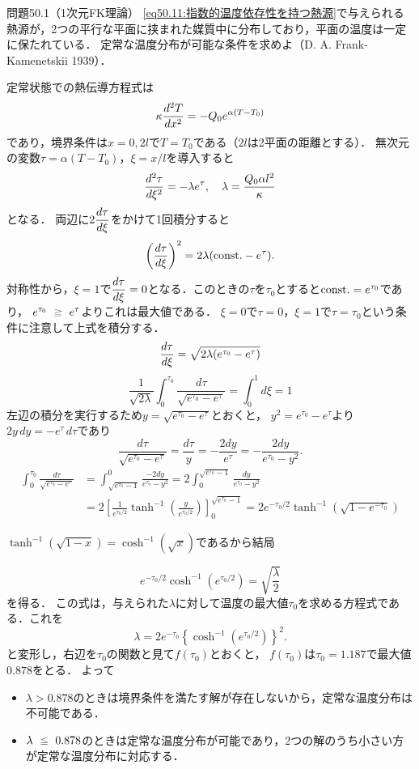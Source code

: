 \begin{mondai}{}{問題50.1（1次元FK理論）}
\eqref{eq50.11:指数的温度依存性を持つ熱源}で与えられる熱源が，2つの平行な平面に挟まれた媒質中に分布しており，平面の温度は一定に保たれている．
定常な温度分布が可能な条件を求めよ（D. A. Frank-Kamenetskii 1939）．
\end{mondai}
\begin{kaitou}
定常状態での熱伝導方程式は
\[
    \kappa \dv[2]{T}{x} = - Q_0 e^{\alpha(T-T_0)}
\]
であり，境界条件は$x=0,2l$で$T=T_0$である（$2l$は2平面の距離とする）．
無次元の変数$\tau = \alpha(T-T_0)$，$\xi = x/l$を導入すると
\[
    \dv[2]{\tau}{\xi} = -\lambda e^{\tau}, \quad \lambda = \frac{Q_0 \alpha l^2}{\kappa}
\]
となる．
両辺に$2\ddv{\tau}{\xi}$をかけて1回積分すると
\[
    \left( \dv{\tau}{\xi} \right)^2 = 2\lambda (\mathrm{const.} - e^{\tau}).
\]
対称性から，$\xi=1$で$\ddv{\tau}{\xi}=0$となる．このときの$\tau$を$\tau_0$とすると$\mathrm{const.}=e^{\tau_0}$であり，
$e^{\tau_0} \ijou e^\tau$よりこれは最大値である．
$\xi=0$で$\tau=0$，$\xi=1$で$\tau=\tau_0$という条件に注意して上式を積分する．
\[
    \dv{\tau}{\xi} = \sqrt{2\lambda (e^{\tau_0} - e^{\tau}) }
\]
\[
    \frac{1}{\sqrt{2\lambda}} \int_{0}^{\tau_0} \frac{d\tau}{\sqrt{e^{\tau_0} - e^{\tau}}} = \int_{0}^{1} d\xi = 1
\]
左辺の積分を実行するため$y=\sqrt{e^{\tau_0} - e^{\tau}}$とおくと，
$y^2 = e^{\tau_0} - e^{\tau}$より$2y\,dy = - e^{\tau} \, d\tau$であり
\[
    \frac{d\tau}{\sqrt{e^{\tau_0} - e^{\tau}}} = \frac{d\tau}{y}
    = -\frac{2dy}{e^\tau} = - \frac{2dy}{e^{\tau_0}-y^2}.
\]
\begin{align*}
    \int_{0}^{\tau_0} \frac{d\tau}{\sqrt{e^{\tau_0} - e^{\tau}}}
    &= \int_{\sqrt{e^{\tau_0}-1}}^{0} \frac{-2dy}{e^{\tau_0}-y^2}
    = 2\int_0^{\sqrt{e^{\tau_0}-1}} \frac{dy}{e^{\tau_0}-y^2} \\
    &= 2 \left[ \frac{1}{e^{\tau_0/2}} \tanh^{-1} \left( \frac{y}{e^{\tau_0/2}} \right) \right]_0^{\sqrt{e^{\tau_0}-1}}
    =  2e^{-\tau_0/2} \tanh^{-1} \left( \sqrt{1-e^{-\tau_0}} \right)
\end{align*}
\begin{details}
$\tanh^{-1}(\sqrt{1-x}) = \cosh^{-1}\left(\sqrt{x}\right)$であるから結局
\end{details}
\[
    e^{-\tau_0/2} \cosh^{-1} ( e^{\tau_0/2} ) = \sqrt{\frac{\lambda}{2}}
\]
を得る．
この式は，与えられた$\lambda$に対して温度の最大値$\tau_0$を求める方程式である．これを
\[
    \lambda = 2 e^{-\tau_0} \left\{ \cosh^{-1} ( e^{\tau_0/2} ) \right\}^2 .
\]
と変形し，右辺を$\tau_0$の関数と見て$f(\tau_0)$とおくと，
$f(\tau_0)$は$\tau_0 = 1.187$で最大値$0.878$をとる．
よって
\begin{itemize}
    \item $\lambda > 0.878$のときは境界条件を満たす解が存在しないから，定常な温度分布は不可能である．
    \item $\lambda \ika 0.878$のときは定常な温度分布が可能であり，2つの解のうち小さい方が定常な温度分布に対応する．
\end{itemize}





\end{kaitou}




